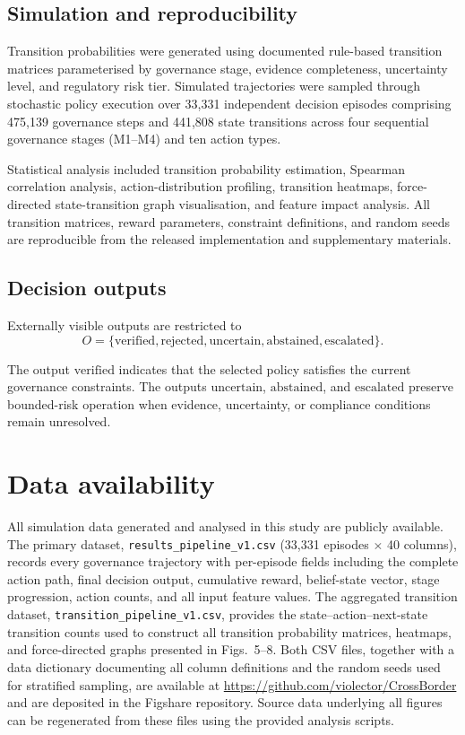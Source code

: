 \documentclass{article}
\begin{document}
\subsection{Simulation and reproducibility}

Transition probabilities were generated using documented rule-based transition matrices parameterised by governance stage, evidence completeness, uncertainty level, and regulatory risk tier. Simulated trajectories were sampled through stochastic policy execution over 33,331 independent decision episodes comprising 475,139 governance steps and 441,808 state transitions across four sequential governance stages (M1--M4) and ten action types.

Statistical analysis included transition probability estimation, Spearman correlation analysis, action-distribution profiling, transition heatmaps, force-directed state-transition graph visualisation, and feature impact analysis. All transition matrices, reward parameters, constraint definitions, and random seeds are reproducible from the released implementation and supplementary materials.

\subsection{Decision outputs}

Externally visible outputs are restricted to
\begin{equation}
O=
\{
\mathrm{verified},
\mathrm{rejected},
\mathrm{uncertain},
\mathrm{abstained},
\mathrm{escalated}
\}.
\end{equation}

The output \(\mathrm{verified}\) indicates that the selected policy satisfies the current governance constraints. The outputs \(\mathrm{uncertain}\), \(\mathrm{abstained}\), and \(\mathrm{escalated}\) preserve bounded-risk operation when evidence, uncertainty, or compliance conditions remain unresolved.

\section{Data availability}
All simulation data generated and analysed in this study are publicly available. The primary dataset, \texttt{results\_pipeline\_v1.csv} (33,331 episodes $\times$ 40 columns), records every governance trajectory with per-episode fields including the complete action path, final decision output, cumulative reward, belief-state vector, stage progression, action counts, and all input feature values. The aggregated transition dataset, \texttt{transition\_pipeline\_v1.csv}, provides the state--action--next-state transition counts used to construct all transition probability matrices, heatmaps, and force-directed graphs presented in Figs.~5--8. Both CSV files, together with a data dictionary documenting all column definitions and the random seeds used for stratified sampling, are available at \url{https://github.com/violector/CrossBorder} and are deposited in the Figshare repository. Source data underlying all figures can be regenerated from these files using the provided analysis scripts.
\end{document}
